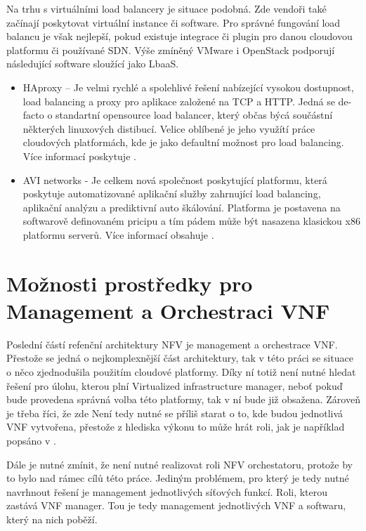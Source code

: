 Na trhu s virtuálními load balancery je situace podobná. Zde vendoři také začínají poskytovat virtuální instance či software. Pro správné fungování load balancu je však nejlepší, pokud existuje integrace či plugin pro danou cloudovou platformu či používané SDN. Výše zmíněný VMware i OpenStack podporují následující software sloužící jako LbaaS.

\begin{itemize}
\item HAproxy – Je velmi rychlé a spolehlivé řešení nabízející vysokou dostupnost, load balancing a proxy pro aplikace založené na TCP a HTTP. Jedná se de-facto o standartní opensource load balancer, který občas býcá součástní některých linuxových distibucí. Velice oblíbené je jeho využítí práce cloudových platformách, kde je jako defaultní možnost pro load balancing. Více informací poskytuje \cite{HAproxy} .
\item AVI networks - Je celkem nová společnost poskytující platformu, která poskytuje automatizované aplikační služby zahrnující load balancing, aplikační analýzu a prediktivní auto škálování. Platforma je postavena na softwarově definovaném pricipu a tím pádem může být nasazena klasickou x86 platformu serverů. Více informací obsahuje \cite{avi_networks} .
\end{itemize}

\section{Možnosti prostředky pro Management a Orchestraci VNF} \label{sec:MANO}

Poslední částí refenční architektury NFV je management a orchestrace VNF. Přestože se jedná o nejkomplexnější část architektury, tak v této práci se situace o něco zjednodušila použitím cloudové platformy. Díky ní totiž není nutné hledat řešení pro úlohu, kterou plní Virtualized infrastructure manager, neboť pokuď bude provedena správná volba této platformy, tak v ní bude již obsažena. Zároveň je třeba říci, že zde Není tedy nutné se příliš starat o to, kde budou jednotlivá VNF vytvořena, přestože z hlediska výkonu to může hrát roli, jak je například popsáno v \cite{vnf_placement} .

Dále je nutné zmínit, že není nutné realizovat roli NFV orchestatoru, protože by to bylo nad rámec cílů této práce. Jediným problémem, pro který je tedy nutné navrhnout řešení je management jednotlivých síťových funkcí. Roli, kterou zastává VNF manager. Tou je tedy management jednotlivých VNF a softwaru, který na nich poběží.

